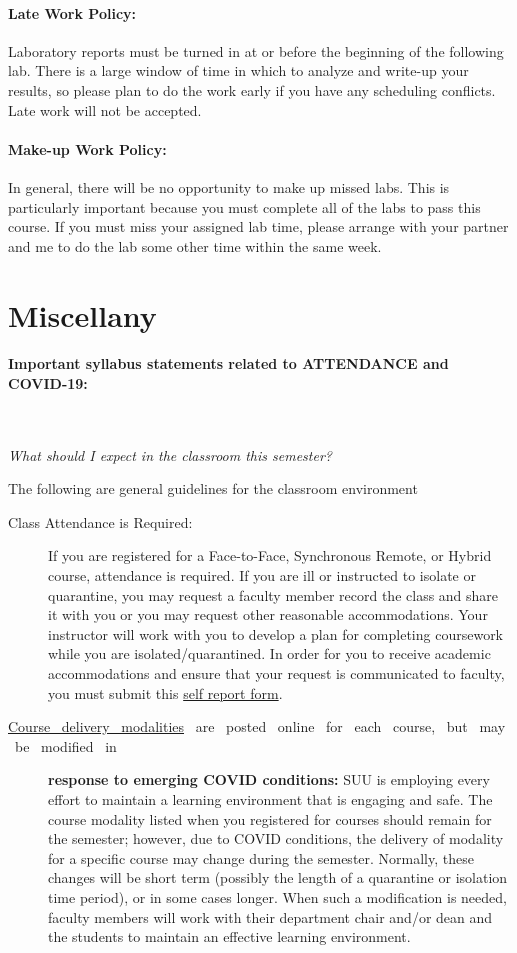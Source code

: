 \documentclass[12pt, letterpaper]{article}
\begin{document}
\paragraph{Late Work Policy:}
Laboratory reports must be turned in at or before the beginning of the following lab. There is a large window of time in which to analyze and write-up your results, so please plan to do the work early if you have any scheduling conflicts. Late work will not be accepted.

\paragraph{Make-up Work Policy:}
In general, there will be no opportunity to make up missed labs. This is particularly important because you must complete all of the labs to pass this course. If you must miss your assigned lab time, please arrange with your partner and me to do the lab some other time within the same week.


\section*{Miscellany}

\paragraph{Important syllabus statements related to ATTENDANCE and COVID-19:} ~

\noindent\emph{What should I expect in the classroom this semester?}

\noindent The following are general guidelines for the classroom environment
\begin{description}
	\item[Class Attendance is Required:] If you are registered for a Face-to-Face, Synchronous Remote, or Hybrid course, attendance is required. If you are ill or instructed to isolate or quarantine, you may request a faculty member record the class and share it with you or you may request other reasonable accommodations. Your instructor will work with you to develop a plan for completing coursework while you are isolated/quarantined. In order for you to receive academic accommodations and ensure that your request is communicated to faculty, you must submit this \href{https://my.suu.edu/covid/selfreport/}{self report form}.
	\item[\href{https://www.suu.edu/registrar/onlinehybrid.html}{Course ~delivery ~modalities} ~are ~posted ~online ~for ~each ~course, ~but ~may ~be ~modified ~in] \textbf{response to emerging COVID conditions:} SUU is employing every effort to maintain a learning environment that is engaging and safe. The course modality listed when you registered for courses should remain for the semester; however, due to COVID conditions, the delivery of modality for a specific course may change during the semester. Normally, these changes will be short term (possibly the length of a quarantine or isolation time period), or in some cases longer. When such a modification is needed, faculty members will work with their department chair and/or dean and the students to maintain an effective learning environment.
\end{description}
\end{document}
